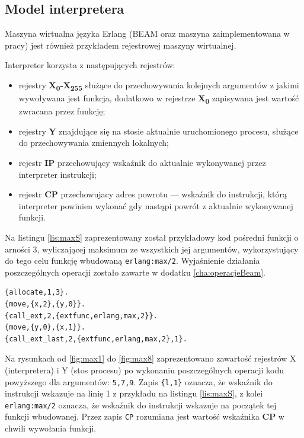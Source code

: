 \subsection{Model interpretera}
\label{sub:interpreterModel}

Maszyna wirtualna języka Erlang (BEAM oraz maszyna zaimplementowana w pracy) jest również przykładem rejestrowej maszyny wirtualnej.

Interpreter korzysta z następujących rejestrów:
\begin{itemize}
\item rejestry \textbf{X\textsubscript{0}-X\textsubscript{255}} służące do przechowywania kolejnych argumentów z jakimi wywoływana jest funkcja, dodatkowo w rejestrze \textbf{X\textsubscript{0}} zapisywana jest wartość zwracana przez funkcję;
\item rejestry \textbf{Y} znajdujące się na stosie aktualnie uruchomionego procesu, służące do przechowywania zmiennych lokalnych;
\item rejestr \textbf{IP} przechowujący wskaźnik do aktualnie wykonywanej przez interpreter instrukcji;
\item rejestr \textbf{CP} przechowujacy adres powrotu --- wskaźnik do instrukcji, którą interpreter powinien wykonać gdy nastąpi powrót z aktualnie wykonywanej funkcji.
\end{itemize}

Na listingu \ref{lis:maxS} zaprezentowany został przykładowy kod pośredni funkcji o arności 3, wyliczającej maksimum ze wszystkich jej argumentów, wykorzystujący do tego celu funkcję wbudowaną \texttt{erlang:max/2}. Wyjaśnienie działania poszczególnych operacji zostało zawarte w dodatku \ref{cha:operacjeBeam}.

\begin{lstlisting}[style=erlang, caption=Kod pośredni funkcji zwracającej maksimum z trzech argumentów, label=lis:maxS]
{allocate,1,3}.
{move,{x,2},{y,0}}.
{call_ext,2,{extfunc,erlang,max,2}}.
{move,{y,0},{x,1}}.
{call_ext_last,2,{extfunc,erlang,max,2},1}.
\end{lstlisting}

Na rysunkach od \ref{fig:max1} do \ref{fig:max8} zaprezentowano zawartość rejestrów X (interpretera) i Y (stos procesu) po wykonaniu poszczególnych operacji kodu powyższego dla argumentów: \texttt{5,7,9}. Zapis \texttt{\{l,1\}} oznacza, że wskaźnik do instrukcji wskazuje na linię 1 z przykładu na listingu \ref{lis:maxS}, z kolei \texttt{erlang:max/2} oznacza, że wskaźnik do instrukcji wskazuje na początek tej funkcji wbudowanej. Przez zapis \texttt{CP} rozumiana jest wartość wskaźnika \textbf{CP} w chwili wywołania funkcji. 

